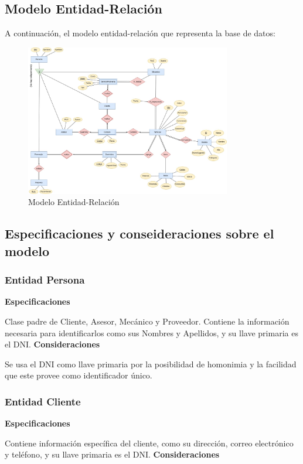 \documentclass[12pt]{article}
\begin{document}
\subsection{Modelo Entidad-Relaci\'on}

A continuación, el modelo entidad-relación que representa la base de datos:

\begin{figure}
\centering
\includegraphics[width=0.8\textwidth]{ER.jpg}
\caption{Modelo Entidad-Relación}
\end{figure}

\subsection{Especificaciones y conseideraciones sobre el modelo}

\subsubsection{Entidad Persona}
\textbf{Especificaciones}

Clase padre de Cliente, Asesor, Mecánico y Proveedor. Contiene la información necesaria para identificarlos como sus Nombres y Apellidos, y su llave primaria es el DNI.
\textbf{Consideraciones}

Se usa el DNI como llave primaria por la posibilidad de homonimia y la facilidad que este provee como identificador único.

\subsubsection{Entidad Cliente}
\textbf{Especificaciones}

Contiene información específica del cliente, como su dirección, correo electrónico y teléfono, y su llave primaria es el DNI.
\textbf{Consideraciones}
\end{document}

